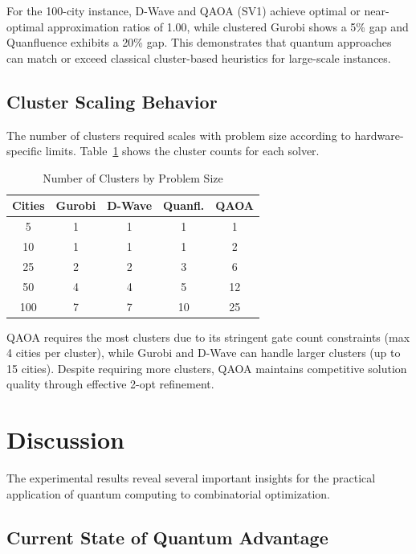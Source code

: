 \documentclass[conference]{IEEEtran}
\begin{document}
For the 100-city instance, D-Wave and QAOA (SV1) achieve optimal or near-optimal approximation ratios of 1.00, while clustered Gurobi shows a 5\% gap and Quanfluence exhibits a 20\% gap. This demonstrates that quantum approaches can match or exceed classical cluster-based heuristics for large-scale instances.

\subsection{Cluster Scaling Behavior}

The number of clusters required scales with problem size according to hardware-specific limits. Table~\ref{tab:clusters} shows the cluster counts for each solver.

\begin{table}[htbp]
\caption{Number of Clusters by Problem Size}
\begin{center}
\begin{tabular}{|c|c|c|c|c|}
\hline
\textbf{Cities} & \textbf{Gurobi} & \textbf{D-Wave} & \textbf{Quanfl.} & \textbf{QAOA} \\
\hline
5 & 1 & 1 & 1 & 1 \\
\hline
10 & 1 & 1 & 1 & 2 \\
\hline
25 & 2 & 2 & 3 & 6 \\
\hline
50 & 4 & 4 & 5 & 12 \\
\hline
100 & 7 & 7 & 10 & 25 \\
\hline
\end{tabular}
\label{tab:clusters}
\end{center}
\end{table}

QAOA requires the most clusters due to its stringent gate count constraints (max 4 cities per cluster), while Gurobi and D-Wave can handle larger clusters (up to 15 cities). Despite requiring more clusters, QAOA maintains competitive solution quality through effective 2-opt refinement.

\section{Discussion}

The experimental results reveal several important insights for the practical application of quantum computing to combinatorial optimization.

\subsection{Current State of Quantum Advantage}
\end{document}

